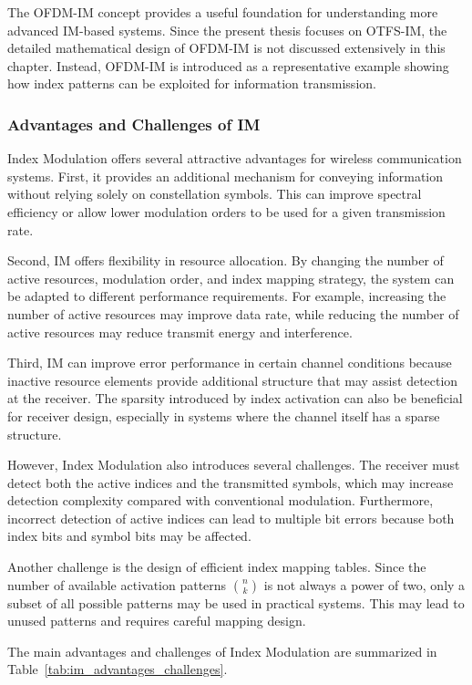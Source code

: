 The OFDM-IM concept provides a useful foundation for understanding more advanced IM-based systems. Since the present thesis focuses on OTFS-IM, the detailed mathematical design of OFDM-IM is not discussed extensively in this chapter. Instead, OFDM-IM is introduced as a representative example showing how index patterns can be exploited for information transmission.

\subsubsection{Advantages and Challenges of IM}

Index Modulation offers several attractive advantages for wireless communication systems. First, it provides an additional mechanism for conveying information without relying solely on constellation symbols. This can improve spectral efficiency or allow lower modulation orders to be used for a given transmission rate.

Second, IM offers flexibility in resource allocation. By changing the number of active resources, modulation order, and index mapping strategy, the system can be adapted to different performance requirements. For example, increasing the number of active resources may improve data rate, while reducing the number of active resources may reduce transmit energy and interference.

Third, IM can improve error performance in certain channel conditions because inactive resource elements provide additional structure that may assist detection at the receiver. The sparsity introduced by index activation can also be beneficial for receiver design, especially in systems where the channel itself has a sparse structure.

However, Index Modulation also introduces several challenges. The receiver must detect both the active indices and the transmitted symbols, which may increase detection complexity compared with conventional modulation. Furthermore, incorrect detection of active indices can lead to multiple bit errors because both index bits and symbol bits may be affected.

Another challenge is the design of efficient index mapping tables. Since the number of available activation patterns \(\binom{n}{k}\) is not always a power of two, only a subset of all possible patterns may be used in practical systems. This may lead to unused patterns and requires careful mapping design.

The main advantages and challenges of Index Modulation are summarized in Table~\ref{tab:im_advantages_challenges}.

